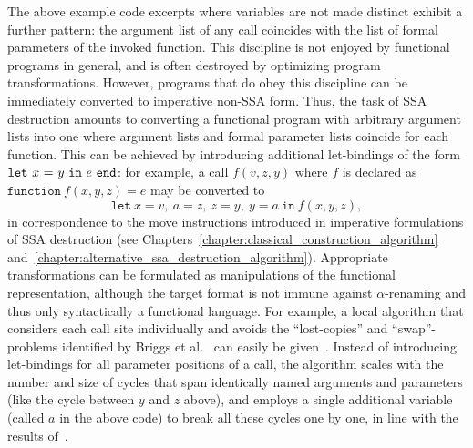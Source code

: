The above example code excerpts where variables are not made distinct
exhibit a further pattern: the argument list of any call coincides
with the list of formal parameters of the invoked function. This
discipline is not enjoyed by functional programs in general, and is
often destroyed by optimizing program transformations. However,
programs that do obey this discipline can be immediately converted to
imperative non-SSA form. Thus, the task of SSA destruction amounts to
converting a functional program with arbitrary argument lists into one
where argument lists and formal parameter lists coincide for each
function. This can be achieved by introducing additional let-bindings
of the form $\mathtt{let}\ {x}\ \mathtt{=}\ {y}\ \mathtt{in}\ {e}\ \mathtt{end}$: for example, a call $f(v,z,y)$ where $f$
is declared as $\mathtt{function}\ f(x,y,z) = e$ may be converted to
$$\mathtt{let}\ x = v,\ a = z,\ z = y,\ y = a\ \mathtt{in}\ {f(x,y,z)},$$ in
correspondence to the move instructions introduced in imperative
formulations of SSA destruction (see
Chapters~\ref{chapter:classical_construction_algorithm}
and~\ref{chapter:alternative_ssa_destruction_algorithm}). Appropriate
transformations can be formulated as manipulations of the functional
representation, although the target format is not immune against
$\alpha$-renaming and thus only syntactically a functional
language. For example, a local algorithm that considers each call site
individually and avoids the ``lost-copies'' and ``swap''-problems
identified by Briggs et al.~\cite{DBLP:journals/spe/BriggsCHS98} can
easily be given~\cite{DBLP:journals/entcs/Beringer07}. Instead of
introducing let-bindings for all parameter positions of a call, the
algorithm scales with the number and size of cycles that span
identically named arguments and parameters (like the cycle between $y$
and $z$ above), and employs a single additional variable (called $a$
in the above code) to break all these cycles one by one, in line with
the results of~\cite{May:1989:PAP:68018.68035}.


\newcommand{\entrynode}[0]{\ensuremath{\mathbf{entry}}}
\newcommand{\exitnode}[0]{\ensuremath{\mathbf{exit}}}
